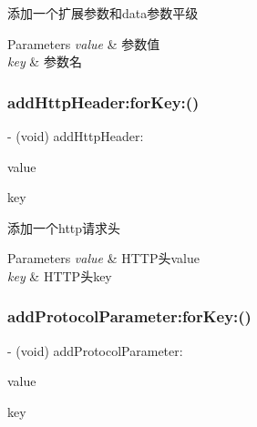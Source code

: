 添加一个扩展参数和data参数平级 
\begin{DoxyParams}{Parameters}
{\em value} & 参数值 \\
\hline
{\em key} & 参数名 \\
\hline
\end{DoxyParams}
\mbox{\label{interface_t_b_s_d_k_request_a94cedf08c4dbb4214146013e30dcbc6b}} 
\subsubsection{\texorpdfstring{add\+Http\+Header\+:for\+Key\+:()}{addHttpHeader:forKey:()}}
{\footnotesize\ttfamily -\/ (void) add\+Http\+Header\+: \begin{DoxyParamCaption}\item[{(N\+S\+String $\ast$)}]{value }\item[{forKey:(N\+S\+String $\ast$)}]{key }\end{DoxyParamCaption}}

添加一个http请求头 
\begin{DoxyParams}{Parameters}
{\em value} & H\+T\+T\+P头value \\
\hline
{\em key} & H\+T\+T\+P头key \\
\hline
\end{DoxyParams}
\mbox{\label{interface_t_b_s_d_k_request_a928333008017bd9bc2e3111ad66f8655}} 
\subsubsection{\texorpdfstring{add\+Protocol\+Parameter\+:for\+Key\+:()}{addProtocolParameter:forKey:()}}
{\footnotesize\ttfamily -\/ (void) add\+Protocol\+Parameter\+: \begin{DoxyParamCaption}\item[{(N\+S\+String $\ast$)}]{value }\item[{forKey:(N\+S\+String $\ast$)}]{key }\end{DoxyParamCaption}}

